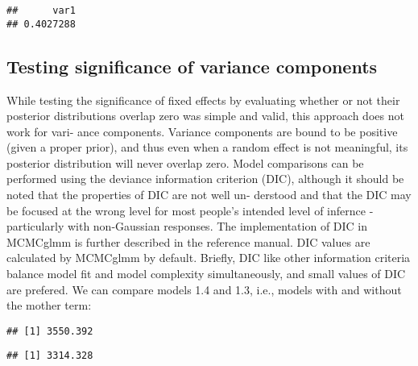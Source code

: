 \documentclass[12pt,]{book}
\newenvironment{Shaded}{\begin{snugshade}}{\end{snugshade}}
\newcommand{\FloatTok}[1]{\textcolor[rgb]{0.00,0.00,0.81}{#1}}
\newcommand{\NormalTok}[1]{#1}
\newcommand{\OperatorTok}[1]{\textcolor[rgb]{0.81,0.36,0.00}{\textbf{#1}}}
\begin{document}
\begin{verbatim}
##      var1 
## 0.4027288
\end{verbatim}

\hypertarget{testing-significance-of-variance-components}{%
\subsection{Testing significance of variance components}\label{testing-significance-of-variance-components}}

While testing the significance of fixed effects by evaluating whether or not their posterior distributions overlap zero was simple and valid, this approach does not work for vari- ance components. Variance components are bound to be positive (given a proper prior), and thus even when a random effect is not meaningful, its posterior distribution will never overlap zero. Model comparisons can be performed using the deviance information criterion (DIC), although it should be noted that the properties of DIC are not well un- derstood and that the DIC may be focused at the wrong level for most people's intended level of infernce - particularly with non-Gaussian responses. The implementation of DIC in MCMCglmm is further described in the reference manual. DIC values are calculated by MCMCglmm by default. Briefly, DIC like other information criteria balance model fit and model complexity simultaneously, and small values of DIC are prefered. We can compare models 1.4 and 1.3, i.e., models with and without the mother term:

\begin{Shaded}
\end{Shaded}

\begin{verbatim}
## [1] 3550.392
\end{verbatim}

\begin{Shaded}
\end{Shaded}

\begin{verbatim}
## [1] 3314.328
\end{verbatim}
\end{document}
